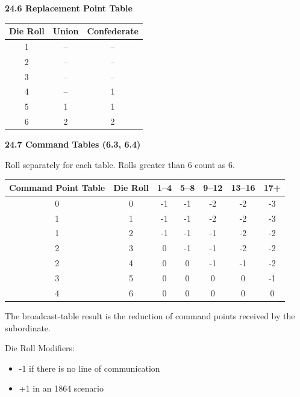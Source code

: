 \noindent
\begin{minipage}[t]{0.28\textwidth}
\centering
{\scriptsize\textbf{24.6 Replacement Point Table}\par}

\vspace{0.4em}
\centering
\scriptsize
\begin{tabular}{ccc}
\toprule
\textbf{Die Roll} & \textbf{Union} & \textbf{Confederate} \\
\midrule
1 & -- & -- \\
2 & -- & -- \\
3 & -- & -- \\
4 & -- & 1 \\
5 & 1 & 1 \\
6 & 2 & 2 \\
\bottomrule
\end{tabular}
\end{minipage}\hfill
\begin{minipage}[t]{0.68\textwidth}
\textbf{24.7 Command Tables (6.3, 6.4)}

\vspace{0.2em}
\centering
\scriptsize
Roll separately for each table. Rolls greater than 6 count as 6.

\vspace{0.5em}
\setlength{\tabcolsep}{4pt}
\begin{minipage}{0.86\textwidth}
\centering
\begin{tabular}{cc*{5}{c}}
\toprule
\textbf{Command Point Table} & \textbf{Die Roll} & \textbf{1--4} & \textbf{5--8} & \textbf{9--12} & \textbf{13--16} & \textbf{17+} \\
\midrule
0 & 0 & -1 & -1 & -2 & -2 & -3 \\
1 & 1 & -1 & -1 & -2 & -2 & -3 \\
1 & 2 & -1 & -1 & -1 & -2 & -2 \\
2 & 3 & 0 & -1 & -1 & -2 & -2 \\
2 & 4 & 0 & 0 & -1 & -1 & -2 \\
3 & 5 & 0 & 0 & 0 & 0 & -1 \\
4 & 6 & 0 & 0 & 0 & 0 & 0 \\
\bottomrule
\end{tabular}
\end{minipage}

\vspace{0.6em}
\begin{minipage}{0.86\textwidth}
\raggedright
\small
The broadcast-table result is the reduction of command points received by the subordinate.

Die Roll Modifiers:
\begin{itemize}
\item -1 if there is no line of communication
\item +1 in an 1864 scenario
\end{itemize}
\end{minipage}
\end{minipage}

